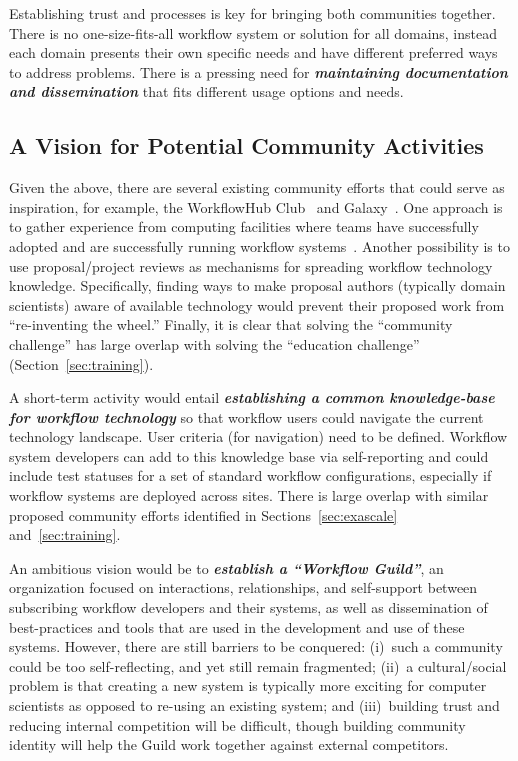 Establishing trust and processes is key for bringing both communities together. There is no one-size-fits-all workflow system or solution for all domains, instead each domain presents their own specific needs and have different preferred ways to address problems. There is a pressing need for \textbf{\emph{maintaining documentation and dissemination}} that fits different usage options and needs.


\subsection{A Vision for Potential Community Activities}

Given the above, there are several existing community efforts that could serve as inspiration, for example, the WorkflowHub Club~\cite{workflowhub} and Galaxy~\cite{galaxy}. One approach is to gather experience from computing facilities where teams have successfully adopted and are successfully running workflow systems~\cite{nersc-workflows}. Another possibility is to use proposal/project reviews as mechanisms for spreading workflow technology knowledge. Specifically, finding ways to make proposal authors (typically domain scientists) aware of available technology would prevent their proposed work from ``re-inventing the wheel.'' Finally, it is clear that solving the ``community challenge'' has large overlap with solving the ``education challenge'' (Section~\ref{sec:training}).

A short-term activity would entail \textbf{\emph{establishing a common knowledge-base for workflow technology}} so that workflow users could navigate the current technology landscape. User criteria (for navigation) need to be defined. Workflow system developers can add to this knowledge base via self-reporting and could include test statuses for a set of standard workflow configurations, especially if workflow systems are deployed across sites. There is large overlap with similar proposed community efforts identified in Sections~\ref{sec:exascale} and~\ref{sec:training}.

An ambitious vision would be to \textbf{\emph{establish a ``Workflow Guild''}}, an organization focused on interactions, relationships, and self-support between subscribing workflow developers and their systems, as well as dissemination of best-practices and tools that are used in the development and use of these systems. However, there are still barriers to be conquered: (i)~such a community could be too self-reflecting, and yet still remain fragmented; (ii)~a cultural/social problem is that creating a new system is typically more exciting for computer scientists as opposed to re-using an existing system; and (iii)~building trust and reducing internal competition will be difficult, though building community identity will help the Guild work together against external competitors.
